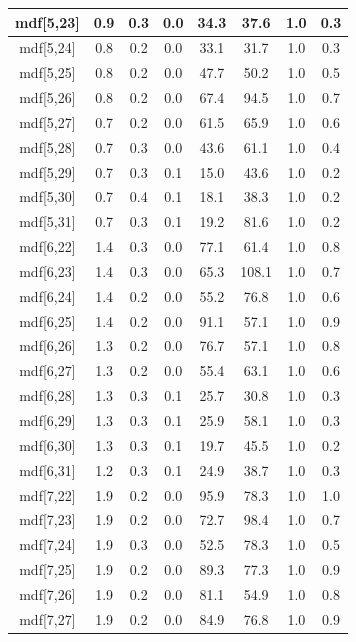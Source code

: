 \begin{longtable}{|c|c|c|c|c|c|c|c|}
\hline
mdf[5,23] & 0.9 & 0.3 & 0.0 & 34.3 & 37.6 & 1.0 & 0.3 \\
\hline
mdf[5,24] & 0.8 & 0.2 & 0.0 & 33.1 & 31.7 & 1.0 & 0.3 \\
\hline
mdf[5,25] & 0.8 & 0.2 & 0.0 & 47.7 & 50.2 & 1.0 & 0.5 \\
\hline
mdf[5,26] & 0.8 & 0.2 & 0.0 & 67.4 & 94.5 & 1.0 & 0.7 \\
\hline
mdf[5,27] & 0.7 & 0.2 & 0.0 & 61.5 & 65.9 & 1.0 & 0.6 \\
\hline
mdf[5,28] & 0.7 & 0.3 & 0.0 & 43.6 & 61.1 & 1.0 & 0.4 \\
\hline
mdf[5,29] & 0.7 & 0.3 & 0.1 & 15.0 & 43.6 & 1.0 & 0.2 \\
\hline
mdf[5,30] & 0.7 & 0.4 & 0.1 & 18.1 & 38.3 & 1.0 & 0.2 \\
\hline
mdf[5,31] & 0.7 & 0.3 & 0.1 & 19.2 & 81.6 & 1.0 & 0.2 \\
\hline
mdf[6,22] & 1.4 & 0.3 & 0.0 & 77.1 & 61.4 & 1.0 & 0.8 \\
\hline
mdf[6,23] & 1.4 & 0.3 & 0.0 & 65.3 & 108.1 & 1.0 & 0.7 \\
\hline
mdf[6,24] & 1.4 & 0.2 & 0.0 & 55.2 & 76.8 & 1.0 & 0.6 \\
\hline
mdf[6,25] & 1.4 & 0.2 & 0.0 & 91.1 & 57.1 & 1.0 & 0.9 \\
\hline
mdf[6,26] & 1.3 & 0.2 & 0.0 & 76.7 & 57.1 & 1.0 & 0.8 \\
\hline
mdf[6,27] & 1.3 & 0.2 & 0.0 & 55.4 & 63.1 & 1.0 & 0.6 \\
\hline
mdf[6,28] & 1.3 & 0.3 & 0.1 & 25.7 & 30.8 & 1.0 & 0.3 \\
\hline
mdf[6,29] & 1.3 & 0.3 & 0.1 & 25.9 & 58.1 & 1.0 & 0.3 \\
\hline
mdf[6,30] & 1.3 & 0.3 & 0.1 & 19.7 & 45.5 & 1.0 & 0.2 \\
\hline
mdf[6,31] & 1.2 & 0.3 & 0.1 & 24.9 & 38.7 & 1.0 & 0.3 \\
\hline
mdf[7,22] & 1.9 & 0.2 & 0.0 & 95.9 & 78.3 & 1.0 & 1.0 \\
\hline
mdf[7,23] & 1.9 & 0.2 & 0.0 & 72.7 & 98.4 & 1.0 & 0.7 \\
\hline
mdf[7,24] & 1.9 & 0.3 & 0.0 & 52.5 & 78.3 & 1.0 & 0.5 \\
\hline
mdf[7,25] & 1.9 & 0.2 & 0.0 & 89.3 & 77.3 & 1.0 & 0.9 \\
\hline
mdf[7,26] & 1.9 & 0.2 & 0.0 & 81.1 & 54.9 & 1.0 & 0.8 \\
\hline
mdf[7,27] & 1.9 & 0.2 & 0.0 & 84.9 & 76.8 & 1.0 & 0.9 \\

\end{longtable}
